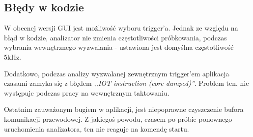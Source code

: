     \subsection{Błędy w kodzie}
        W obecnej wersji GUI jest możliwość wyboru trigger'a.
        Jednak ze względu na błąd w kodzie, analizator nie zmienia częstotliwości próbkowania, podczas wybrania wewnętrznego wyzwalania - ustawiona jest domyślna częstotliwość 5kHz.
        
        Dodatkowo, podczas analizy wyzwalanej zewnętrznym trigger'em aplikacja czasami zamyka się z błędem \textit{,,IOT instruction (core dumped)''}.
        Problem ten, nie występuje podczas pracy na wewnętrznym taktowaniu.

        Ostatnim zauważonym bugiem w aplikacji, jest niepoprawne czyszczenie bufora komunikacji przewodowej.
        Z jakiegoś powodu, czasem po próbie ponownego uruchomienia analizatora, ten nie reaguje na komendę startu.


